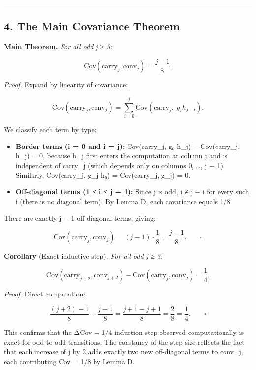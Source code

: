 \documentclass[
  11pt,
]{article}
\begin{document}
\begin{center}\rule{0.5\linewidth}{0.5pt}\end{center}

\newpage

\subsection{4. The Main Covariance Theorem}\label{the-main-covariance-theorem}

\textbf{Main Theorem.} \emph{For all odd j ≥ 3:}

\[\text{Cov}(\text{carry}_j, \text{conv}_j) = \frac{j-1}{8}.\]

\emph{Proof.} Expand by linearity of covariance:

\[\text{Cov}(\text{carry}_j, \text{conv}_j) = \sum_{i=0}^{j} \text{Cov}(\text{carry}_j,\; g_i h_{j-i}).\]

We classify each term by type:

\begin{itemize}
\item
  \textbf{Border terms (i = 0 and i = j):} Cov(carry\_j, g₀ h\_j) =
  Cov(carry\_j, h\_j) = 0, because h\_j first enters the computation at column j
  and is independent of carry\_j (which depends only on columns 0, \ldots, j −
  1). Similarly, Cov(carry\_j, g\_j h₀) = Cov(carry\_j, g\_j) = 0.
\item
  \textbf{Off-diagonal terms (1 ≤ i ≤ j − 1):} Since j is odd, i ≠ j − i for
  every such i (there is no diagonal term). By Lemma D, each covariance equals
  1/8.
\end{itemize}

There are exactly j − 1 off-diagonal terms, giving:

\[\text{Cov}(\text{carry}_j, \text{conv}_j) = (j-1) \cdot \frac{1}{8} = \frac{j-1}{8}. \qquad \square\]

\textbf{Corollary} (Exact inductive step). \emph{For all odd j ≥ 3:}

\[\text{Cov}(\text{carry}_{j+2}, \text{conv}_{j+2}) - \text{Cov}(\text{carry}_j, \text{conv}_j) = \frac{1}{4}.\]

\emph{Proof.} Direct computation:

\[\frac{(j+2) - 1}{8} - \frac{j - 1}{8} = \frac{j+1 - j + 1}{8} = \frac{2}{8} = \frac{1}{4}. \qquad \square\]

This confirms that the ΔCov = 1/4 induction step observed computationally is
exact for odd-to-odd transitions. The constancy of the step size reflects the
fact that each increase of j by 2 adds exactly two new off-diagonal terms to
conv\_j, each contributing Cov = 1/8 by Lemma D.
\end{document}
